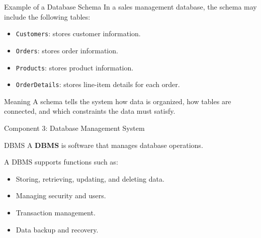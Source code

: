 \documentclass[aspectratio=169,11pt]{beamer}
\newcommand{\keyword}[1]{\textcolor{accent}{\textbf{#1}}}
\newcommand{\tightlist}{\setlength{\itemsep}{2pt}\setlength{\parskip}{0pt}}
\begin{document}
\begin{frame}{Example of a Database Schema}
\small
In a sales management database, the schema may include the following tables:

\begin{itemize}
\tightlist
  \item \texttt{Customers}: stores customer information.
  \item \texttt{Orders}: stores order information.
  \item \texttt{Products}: stores product information.
  \item \texttt{OrderDetails}: stores line-item details for each order.
\end{itemize}

\begin{block}{Meaning}
A schema tells the system how data is organized, how tables are connected, and which constraints the data must satisfy.
\end{block}
\end{frame}

\begin{frame}{Component 3: Database Management System}
\small
\begin{block}{DBMS}
A \keyword{DBMS} is software that manages database operations.
\end{block}

A DBMS supports functions such as:
\begin{itemize}
\tightlist
  \item Storing, retrieving, updating, and deleting data.
  \item Managing security and users.
  \item Transaction management.
  \item Data backup and recovery.
\end{itemize}
\end{frame}
\end{document}
